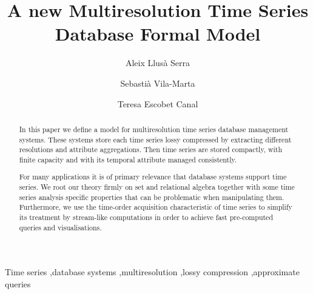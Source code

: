 \documentclass[
  review,
  twocolumn,
  5p,
  sort&compress,
]{elsarticle}
\begin{document}


\begin{frontmatter}

  \title{A new Multiresolution Time Series \\ Database Formal Model}


  \author
  [dipse]
  {Aleix Llus\`{a} Serra
  }

  \author
  [dipse]
  {Sebasti\`{a} Vila-Marta
  }

  \author
  [dipse]
  {Teresa Escobet Canal
  }



  \address
  [dipse]
  {Department of Electronic System Design and Programming\\ Universitat Polit\`{e}cnica de Catalunya\\ Av.~Bases de Manresa 61--73, 08242 Manresa, ES-CT}



  \begin{abstract}
    In this paper we define a model for multiresolution time series
    database management systems. These systems store each time series
    lossy compressed by extracting different resolutions and attribute
    aggregations. Then time series are stored compactly, with finite
    capacity and with its temporal attribute managed consistently.

    For many applications it is of primary relevance that database
    systems support time series.  We root our theory firmly on set and
    relational algebra together with some time series analysis
    specific properties that can be problematic when manipulating
    them.  Furthermore, we use the time-order acquisition
    characteristic of time series to simplify its treatment by
    stream-like computations in order to achieve fast pre-computed
    queries and visualisations.
  \end{abstract}


  \begin{keyword}
    Time series \sep database systems \sep multiresolution \sep lossy
    compression \sep approximate queries
  \end{keyword}

\end{frontmatter}
\end{document}
